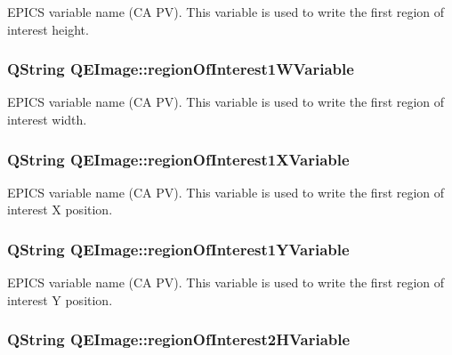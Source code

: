 \label{classQEImage_a0918d2df76f4fc169173847db08b9ecf}
EPICS variable name (CA PV). This variable is used to write the first region of interest height. \hypertarget{classQEImage_ad8bfe4dc608f43046df55a90bad0daf8}{
\subsubsection[{regionOfInterest1WVariable}]{\setlength{\rightskip}{0pt plus 5cm}QString QEImage::regionOfInterest1WVariable}}
\label{classQEImage_ad8bfe4dc608f43046df55a90bad0daf8}
EPICS variable name (CA PV). This variable is used to write the first region of interest width. \hypertarget{classQEImage_a7351e94f008f83761df0c1b128734144}{
\subsubsection[{regionOfInterest1XVariable}]{\setlength{\rightskip}{0pt plus 5cm}QString QEImage::regionOfInterest1XVariable}}
\label{classQEImage_a7351e94f008f83761df0c1b128734144}
EPICS variable name (CA PV). This variable is used to write the first region of interest X position. \hypertarget{classQEImage_a886214b38ed03319075648f5dd775012}{
\subsubsection[{regionOfInterest1YVariable}]{\setlength{\rightskip}{0pt plus 5cm}QString QEImage::regionOfInterest1YVariable}}
\label{classQEImage_a886214b38ed03319075648f5dd775012}
EPICS variable name (CA PV). This variable is used to write the first region of interest Y position. \hypertarget{classQEImage_a0a1ae6f9b52eebd5c1c8a2849387f933}{
\subsubsection[{regionOfInterest2HVariable}]{\setlength{\rightskip}{0pt plus 5cm}QString QEImage::regionOfInterest2HVariable}}
